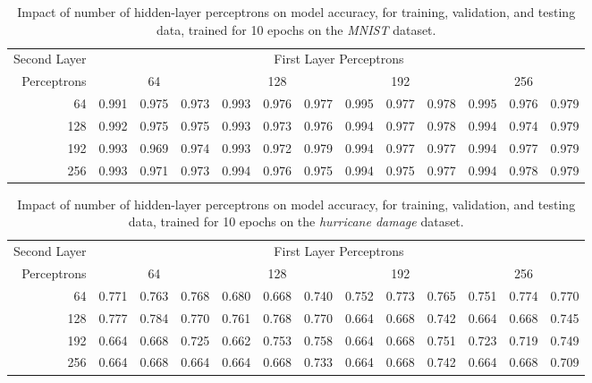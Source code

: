 \documentclass{article}
\begin{document}
\begin{table}[h!]
	\centering
	\caption{Impact of number of hidden-layer perceptrons on model accuracy, for training, validation, and testing data, trained for 10 epochs on the \emph{MNIST} dataset.}
	\label{tbl:m-2l}
	\begin{tabular}{r|ccc|ccc|ccc|ccc}
		Second Layer & \multicolumn{12}{c}{First Layer Perceptrons} \\
		Perceptrons & \multicolumn{3}{c}{64} & \multicolumn{3}{c}{128} & \multicolumn{3}{c}{192} & \multicolumn{3}{c}{256} \\
		\hline
		64 & 0.991 & 0.975 & 0.973 & 0.993 & 0.976 & 0.977 & 0.995 & 0.977 & 0.978 & 0.995 & 0.976 & 0.979 \\
		128 & 0.992 & 0.975 & 0.975 & 0.993 & 0.973 & 0.976 & 0.994 & 0.977 & 0.978 & 0.994 & 0.974 & 0.979 \\
		192 & 0.993 & 0.969 & 0.974 & 0.993 & 0.972 & 0.979 & 0.994 & 0.977 & 0.977 & 0.994 & 0.977 & 0.979 \\
		256 & 0.993 & 0.971 & 0.973 & 0.994 & 0.976 & 0.975 & 0.994 & 0.975 & 0.977 & 0.994 & 0.978 & 0.979
	\end{tabular}
\end{table}

\begin{table}[h!]
	\centering
	\caption{Impact of number of hidden-layer perceptrons on model accuracy, for training, validation, and testing data, trained for 10 epochs on the \emph{hurricane damage} dataset.}
	\label{tbl:h-2l}
	\begin{tabular}{r|ccc|ccc|ccc|ccc}
		Second Layer & \multicolumn{12}{c}{First Layer Perceptrons} \\
		Perceptrons & \multicolumn{3}{c}{64} & \multicolumn{3}{c}{128} & \multicolumn{3}{c}{192} & \multicolumn{3}{c}{256} \\
		\hline
		64 & 0.771 & 0.763 & 0.768 & 0.680 & 0.668 & 0.740 & 0.752 & 0.773 & 0.765 & 0.751 & 0.774 & 0.770 \\
		128 & 0.777 & 0.784 & 0.770 & 0.761 & 0.768 & 0.770 & 0.664 & 0.668 & 0.742 & 0.664 & 0.668 & 0.745 \\
		192 & 0.664 & 0.668 & 0.725 & 0.662 & 0.753 & 0.758 & 0.664 & 0.668 & 0.751 & 0.723 & 0.719 & 0.749 \\
		256 & 0.664 & 0.668 & 0.664 & 0.664 & 0.668 & 0.733 & 0.664 & 0.668 & 0.742 & 0.664 & 0.668 & 0.709
	\end{tabular}
\end{table}
\end{document}

